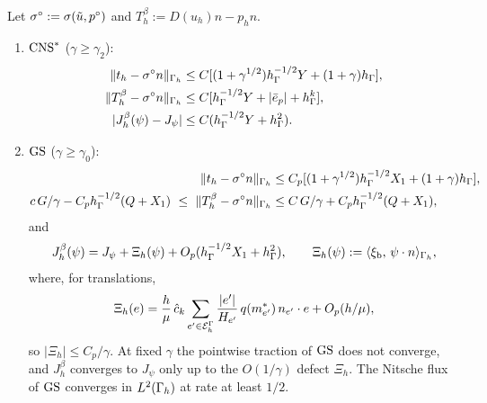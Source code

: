 \begin{proposition}[Tractions on $\Gh$]\label{pd:prop:beta}
Let $\sigma^\circ:=\sigma(\tilde u,p^\circ)$ and $T^\beta_h:=D(u_h)n-p_hn$.
\begin{enumerate}[label=(\alph*)]
\item $\mathrm{CNS}^\ast$ ($\gamma\ge\gamma_2$):
\begin{align*}
\lVert t_h-\sigma^\circ n\rVert_{\Gamma_h}&\le C[(1+\gamma^{1/2})h_\Gamma^{-1/2}Y+(1+\gamma)h_\Gamma],\\
\lVert T^\beta_h-\sigma^\circ n\rVert_{\Gamma_h}&\le C[h_\Gamma^{-1/2}Y+|\bar e_p|+h_\Gamma^k],\\
|J^\beta_h(\psi)-J_\psi|&\le C(h_\Gamma^{-1/2}Y+h_\Gamma^2).
\end{align*}
\item $\mathrm{GS}$ ($\gamma\ge\gamma_0$):
\begin{align*}
\lVert t_h-\sigma^\circ n\rVert_{\Gamma_h}&\le C_p[(1+\gamma^{1/2})h_\Gamma^{-1/2}X_1+(1+\gamma)h_\Gamma],\\
c\,G/\gamma-C_ph_\Gamma^{-1/2}(Q+X_1)\ \le\ \lVert T^\beta_h-\sigma^\circ n\rVert_{\Gamma_h}&\le C\,G/\gamma+C_ph_\Gamma^{-1/2}(Q+X_1),
\end{align*}
and
\[
J^\beta_h(\psi)=J_\psi+\Xi_h(\psi)+O_p(h_\Gamma^{-1/2}X_1+h_\Gamma^2),\qquad \Xi_h(\psi):=\langle \xi_{\mathrm b},\, \psi\cdot n\rangle_{\Gamma_h},
\]
where, for translations,
\[
\Xi_h(e)=\frac h\mu\,\hat c_k\sum_{e'\in\mathcal E_h^\Gamma}\frac{|e'|}{H_{e'}}\,q(m_{e'}^\ast)\,n_{e'}\cdot e+O_p(h/\mu),
\]
so $|\Xi_h|\le C_p/\gamma$. At fixed $\gamma$ the pointwise traction of $\mathrm{GS}$ does not converge, and $J^\beta_h$ converges to $J_\psi$ only up to the $O(1/\gamma)$ defect $\Xi_h$. The Nitsche flux of $\mathrm{GS}$ converges in $L^2(\Gamma_h)$ at rate at least $1/2$.
\end{enumerate}
\end{proposition}

